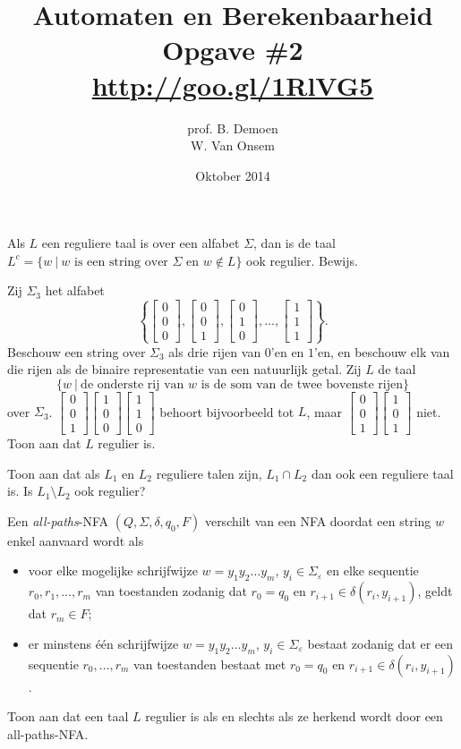 \documentclass[a4paper]{article}
\title{Automaten en Berekenbaarheid\\Opgave \#2\\\url{http://goo.gl/1RlVG5}}
\author{prof. B. Demoen\\W. Van Onsem}
\date{Oktober 2014}
\newcommand{\kolom}[1]{ \left[ \begin{array}{c} #1 \end{array} \right] }
\begin{document}
\maketitle

\begin{question}
Als $L$ een reguliere taal is over een alfabet $\Sigma$, dan is de taal $L^c = \{ w \ | \ \mbox{$w$  is een string over $\Sigma$ en $w \not\in L$} \}$ ook regulier. Bewijs.
\end{question}

\begin{question}
Zij $\Sigma_3$ het alfabet 
{\tiny
	\[ \left\{ \kolom{ 0 \\ 0 \\ 0}, \kolom{ 0 \\ 0 \\ 1}, \kolom{ 0 \\ 1 \\ 0}, \ldots, \kolom{ 1 \\ 1 \\ 1} \right\}. \]
}
Beschouw een string over $\Sigma_3$ als drie rijen van $0$'en en $1$'en, en beschouw elk van die rijen als de binaire representatie van een natuurlijk getal. Zij $L$ de taal 
\[ \{ w \ | \ \mbox{de onderste rij van $w$ is de som van de twee bovenste rijen} \} \]
over $\Sigma_3$. {\tiny $\kolom{ 0 \\ 0 \\ 1} \kolom{ 1 \\ 0 \\ 0} \kolom{ 1 \\ 1 \\ 0}$} behoort bijvoorbeeld tot $L$, maar { \tiny $\kolom{ 0 \\0 \\ 1} \kolom{ 1 \\ 0 \\ 1}$} niet. Toon aan dat $L$ regulier is.
\end{question}

\begin{question}
Toon aan dat als $L_1$ en $L_2$ reguliere talen zijn, $L_1 \cap L_2$ dan ook een reguliere taal is. Is $L_1 \setminus L_2$ ook regulier?
\end{question}

\begin{question}
Een \emph{all-paths}-NFA $(Q,\Sigma,\delta,q_0,F)$ verschilt van een NFA doordat een string $w$ enkel aanvaard wordt als 
\begin{itemize}
  \item voor elke mogelijke schrijfwijze $w = y_1 y_2 \ldots y_m$, $y_i \in \Sigma_{\varepsilon}$ en elke sequentie $r_0, r_1, \ldots, r_m$ van toestanden zodanig dat $r_0 = q_0$ en $r_{i+1} \in \delta(r_i,y_{i+1})$, geldt dat $r_m \in F$;
  \item er minstens \'e\'en schrijfwijze $w = y_1 y_2 \ldots y_m$, $y_i \in \Sigma_{\varepsilon}$ bestaat zodanig dat er een sequentie $r_0, \ldots, r_m$ van toestanden bestaat met $r_0 = q_0$ en $r_{i+1} \in \delta(r_i,y_{i+1})$.
\end{itemize}
Toon aan dat een taal $L$ regulier is als en slechts als ze herkend wordt door een all-paths-NFA.
\end{question}
\end{document}
